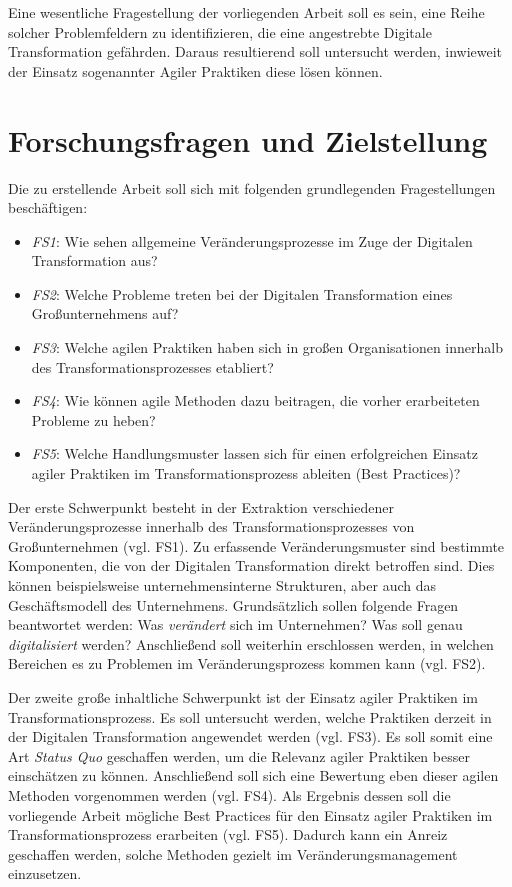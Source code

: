 Eine wesentliche Fragestellung der vorliegenden Arbeit soll es sein, eine Reihe solcher Problemfeldern zu identifizieren, die eine angestrebte Digitale Transformation gefährden. Daraus resultierend soll untersucht werden, inwieweit der Einsatz sogenannter Agiler Praktiken diese lösen können.

\section{Forschungsfragen und Zielstellung}

Die zu erstellende Arbeit soll sich mit folgenden grundlegenden
Fragestellungen beschäftigen:

\begin{itemize}[noitemsep, topsep=0pt]
	\item \textit{FS1}: Wie sehen allgemeine Veränderungsprozesse im Zuge der Digitalen Transformation aus?
	\item \textit{FS2}: Welche Probleme treten bei der Digitalen Transformation eines Großunternehmens auf?
	\item \textit{FS3}: Welche agilen Praktiken haben sich in großen Organisationen innerhalb des Transformationsprozesses etabliert?
	\item \textit{FS4}: Wie können agile Methoden dazu beitragen, die vorher erarbeiteten Probleme zu heben?
	\item \textit{FS5}: Welche Handlungsmuster lassen sich für einen erfolgreichen Einsatz agiler Praktiken im Transformationsprozess ableiten (Best Practices)?
\end{itemize}
Der erste Schwerpunkt besteht in der Extraktion verschiedener Veränderungsprozesse innerhalb des Transformationsprozesses von Großunternehmen (vgl. FS1). Zu erfassende Veränderungsmuster sind bestimmte Komponenten, die von der Digitalen Transformation direkt betroffen sind. Dies können beispielsweise unternehmensinterne Strukturen, aber auch das Geschäftsmodell des Unternehmens. Grundsätzlich sollen folgende Fragen beantwortet werden: Was \textit{verändert} sich im Unternehmen? Was soll genau \textit{digitalisiert} werden? Anschließend soll weiterhin erschlossen werden,  in welchen Bereichen es zu Problemen im Veränderungsprozess kommen kann (vgl. FS2).

Der zweite große inhaltliche Schwerpunkt ist der Einsatz agiler Praktiken im Transformationsprozess. Es soll untersucht werden, welche Praktiken derzeit in der Digitalen Transformation angewendet werden (vgl. FS3). Es soll somit eine Art \textit{Status Quo} geschaffen werden, um die Relevanz agiler Praktiken besser einschätzen zu können. Anschließend soll sich eine Bewertung eben dieser agilen Methoden vorgenommen werden (vgl. FS4). Als Ergebnis dessen soll die vorliegende Arbeit mögliche Best Practices für den Einsatz agiler Praktiken im Transformationsprozess erarbeiten (vgl. FS5). Dadurch kann ein Anreiz geschaffen werden, solche Methoden gezielt im Veränderungsmanagement einzusetzen. 

